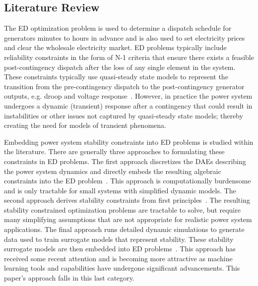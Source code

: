 \documentclass[lettersize,journal]{IEEEtran}
\begin{document}
\subsection{Literature Review} 
The ED optimization problem is used to determine a dispatch schedule for generators minutes to hours in advance and is also used to set electricity prices and clear the wholesale electricity market. ED problems typically include reliability constraints in the form of N-1 criteria that ensure there exists a feasible post-contingency dispatch after the loss of any single element in the system.  These constraints typically use quasi-steady state models to represent the transition from the pre-contingency dispatch to the post-contingency generator outputs, e.g. droop and voltage response~\cite{aravena2023recent}.  However, in practice the power system undergoes a dynamic (transient) response after a contingency that could result in instabilities or other issues not captured by quasi-steady state models; thereby creating the need for models of transient phenomena.

Embedding power system stability constraints into ED problems is studied within the literature.  There are generally three approaches to formulating these constraints in ED problems.  The first approach discretizes the DAEs describing the power system dynamics and directly embeds the resulting algebraic constraints into the ED problem~\cite{gan2000stability,jiang2010enhanced}.  This approach is computationally burdensome and is only tractable for small systems with simplified dynamic models. The second approach derives stability constraints from first principles~\cite{chavez2014governor,doherty2005frequency}.  The resulting stability constrained optimization problems are tractable to solve, but require many simplifying assumptions that are not appropriate for realistic power system applications.  The final approach runs detailed dynamic simulations to generate data used to train surrogate models that represent stability.  These stability surrogate models are then embedded into ED problems~\cite{ahmadi2013two,gutierrez2010neural}.  This approach has received some recent attention and is becoming more attractive as machine learning tools and capabilities have undergone significant advancements. This paper's approach falls in this last category.
\end{document}
